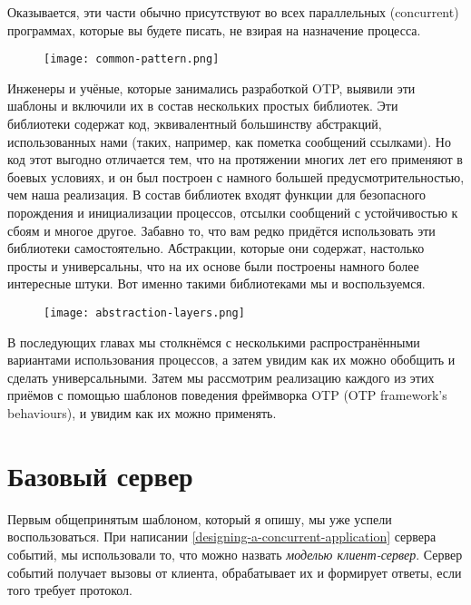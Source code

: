 Оказывается, эти части обычно присутствуют во всех параллельных (concurrent) программах, которые вы будете писать, не взирая на назначение процесса.
\begin{figure}[h!]
    \centering
    \texttt{[image: common-pattern.png]}
\end{figure}

Инженеры и учёные, которые занимались разработкой OTP, выявили эти шаблоны и включили их в состав нескольких простых библиотек.
Эти библиотеки содержат код, эквивалентный большинству абстракций, использованных нами (таких, например, как пометка сообщений ссылками).
Но код этот выгодно отличается тем, что на протяжении многих лет его применяют в боевых условиях, и он был построен с намного большей предусмотрительностью, чем наша реализация.
В состав библиотек входят функции для безопасного порождения и инициализации процессов, отсылки сообщений с устойчивостью к сбоям и многое другое.
Забавно то, что вам редко придётся использовать эти библиотеки самостоятельно.
Абстракции, которые они содержат, настолько просты и универсальны, что на их основе были построены намного более интересные штуки.
Вот именно такими библиотеками мы и воспользуемся.
\begin{figure}[h!]
    \centering
    \texttt{[image: abstraction-layers.png]}
\end{figure}
В последующих главах мы столкнёмся с несколькими распространёнными вариантами использования процессов, а затем увидим как их можно обобщить и сделать универсальными.
Затем мы рассмотрим реализацию каждого из этих приёмов с помощью шаблонов поведения фреймворка OTP (OTP framework's behaviours), и увидим как их можно применять.
\section{Базовый сервер}
\label{the-basic-server}
Первым общепринятым шаблоном, который я опишу, мы уже успели воспользоваться.
При написании \ref{designing-a-concurrent-application} сервера событий, мы использовали то, что можно назвать \emph{моделью клиент\--сервер}.
Сервер событий получает вызовы от клиента, обрабатывает их и формирует ответы, если того требует протокол.


